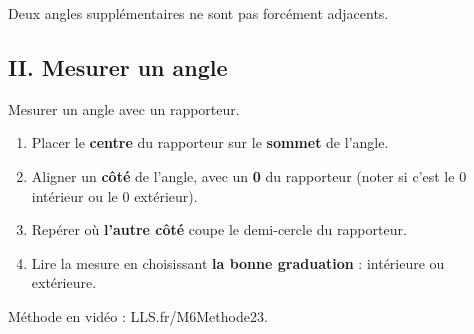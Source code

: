 \begin{Remarque}
\leavevmode\vspace{-\baselineskip}
Deux angles supplémentaires ne sont pas forcément adjacents.
\end{Remarque}
\vspace{0.5cm}



\subsection*{II. Mesurer un angle}


\begin{Méthode}[c] Mesurer un angle avec un rapporteur. \\
\begin{minipage}[t]{0.65\textwidth}
\vspace{0pt}
\begin{enumerate}[label=\textcolor{Couleur7}{\textbf{\arabic*.}}, leftmargin=*, itemsep=4pt]
    \item Placer le \textbf{centre} du rapporteur sur le \textbf{sommet} de l'angle.
    \item Aligner un \textbf{côté}  de l'angle, avec un \textbf{0} du rapporteur (noter si c'est le 0 intérieur ou le 0 extérieur).
    \item Repérer où \textbf{l'autre côté} coupe le demi-cercle du rapporteur.
    \item Lire la mesure en choisissant \textbf{la bonne graduation} : intérieure ou extérieure.
\end{enumerate}
\end{minipage}\hfill
\begin{minipage}[t]{0.3\textwidth}
\vspace{0pt}
\begin{center}
\end{center}


\end{minipage}
\vspace{0.5cm}

\ligne


\end{Méthode}

\begin{Remarque}
Méthode en vidéo : LLS.fr/M6Methode23.
\end{Remarque}




